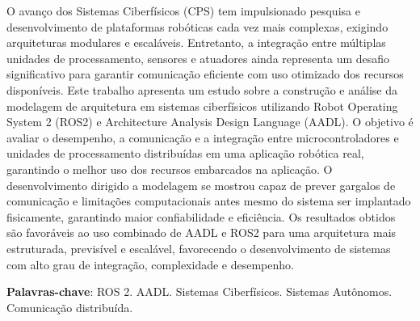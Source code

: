 \begin{resumo}
O avanço dos Sistemas Ciberfísicos (CPS) tem impulsionado pesquisa e desenvolvimento de plataformas robóticas cada vez mais complexas, exigindo arquiteturas modulares e escaláveis. Entretanto, a integração entre múltiplas unidades de processamento, sensores e atuadores ainda representa um desafio significativo para garantir comunicação eficiente com uso otimizado dos recursos disponíveis.
Este trabalho apresenta um estudo sobre a construção e análise da modelagem de arquitetura em sistemas ciberfísicos utilizando Robot Operating System 2 (ROS2) e Architecture Analysis Design Language (AADL). O objetivo é avaliar o desempenho, a comunicação e a integração entre microcontroladores e unidades de processamento distribuídas em uma aplicação robótica real, garantindo o melhor uso dos recursos embarcados na aplicação. 
O desenvolvimento dirigido a modelagem se mostrou capaz de prever gargalos de comunicação e limitações computacionais antes mesmo do sistema ser implantado fisicamente, garantindo maior confiabilidade e eficiência. Os resultados obtidos são favoráveis ao uso combinado de AADL e ROS2 para uma arquitetura mais estruturada, previsível e escalável, favorecendo o desenvolvimento de sistemas com alto grau de integração, complexidade e desempenho.

\textbf{Palavras-chave}: ROS 2. AADL. Sistemas Ciberfísicos. Sistemas Autônomos. Comunicação distribuída.
\end{resumo}